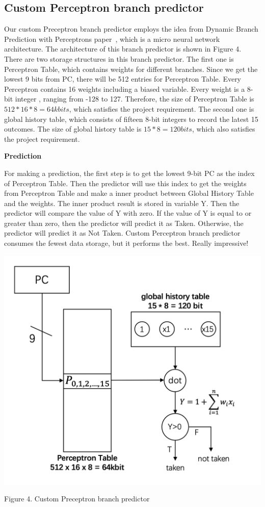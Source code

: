 \documentclass[conference]{IEEEtran}
\begin{document}
\subsection{Custom Perceptron branch predictor}
Our custom Preceptron branch predictor employs the idea from Dynamic Branch Prediction with Perceptrons paper~\cite{nicepaper4}, which is a micro neural network architecture. The architecture of this branch predictor is shown in Figure 4.
There are two storage structures in this branch predictor. The first one is Perceptron Table, which contains weights for different branches. Since we get the lowest 9 bits from PC, there will be 512 entries for Perceptron Table. 
Every Perceptron contains 16 weights including a biased variable. Every weight is a 8-bit integer , ranging from -128 to 127. Therefore, the size of Perceptron Table is $512*16*8 = 64k  bits$, which satisfies the project requirement. 
The second one is global history table, which consists of fifteen 8-bit integers to record the latest 15 outcomes. The size of global history table is $15*8 = 120  bits$, which also 
satisfies the project requirement. \\

\begin{center}
  \textbf{Prediction}
\end{center}
For making a prediction, the first step is to get the lowest 9-bit PC as the index of Perceptron Table. Then the predictor will use this index to get the weights from Perceptron Table and make a inner product between Global History Table and the weights.
The inner product result is stored in variable Y. Then the predictor will compare the value of Y with zero. If the value of Y is equal to or greater than zero, then the predictor will predict it as Taken. Otherwise, the predictor will predict it as 
Not Taken. Custom Perceptron branch predictor consumes the fewest data storage, but it performs the best. Really impressive!

\includegraphics[width=\linewidth]{perceptron.png}
\begin{center}
  {\small Figure 4. Custom Preceptron branch predictor}
\end{center}
\end{document}
